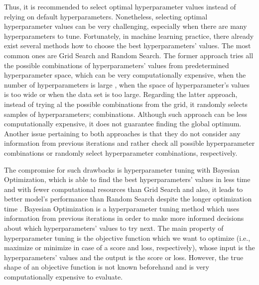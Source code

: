 Thus, it is recommended to select optimal hyperparameter values instead of relying on default hyperparameters.
Nonetheless, selecting optimal hyperparameter values can be very challenging, especially when there are many hyperparameters to tune.
Fortunately, in machine learning practice, there already exist several methods how to choose the best hyperparameters' values. The most common ones are Grid Search and Random Search.
The former approach tries all the possible combinations of hyperparameters' values from predetermined hyperparameter space, which can be very computationally expensive, when the number of hyperparameters is large \citep{marinov2019hyperparameter}, when the space of hyperparameter's values is too wide or when the data set is too large.
Regarding the latter approach, instead of trying al the possible combinations from the grid, it randomly selects samples of hyperparameters; combinations. Although such approach can be less computationally expensive, it does not guarantee finding  the global optimum.
Another issue pertaining to both approaches is that they do not consider any information from previous iterations and rather check all possible hyperparameter combinations or randomly select hyperparameter combinations, respectively.

The compromise for such drawbacks is hyperparameter tuning with Bayesian Optimization, which is able to find the best hyperparameters' values in less time and with  fewer computational resources than Grid Search and also, it leads to better model's performance than Random Search despite the longer optimization time \citep{drahokoupil2022application}.
Bayesian Optimization is a hyperparameter tuning method which uses information from previous iterations in order to make more informed decisions about which hyperparameters' values to try next.
The main property of hyperparameter tuning is the objective function which we want to optimize (i.e., maximize or minimize in case of a score and loss, respectively), whose input is the hyperparameters' values and the output is the score or loss. However, the true shape of an objective function is not known beforehand and is very computationally expensive to evaluate.


